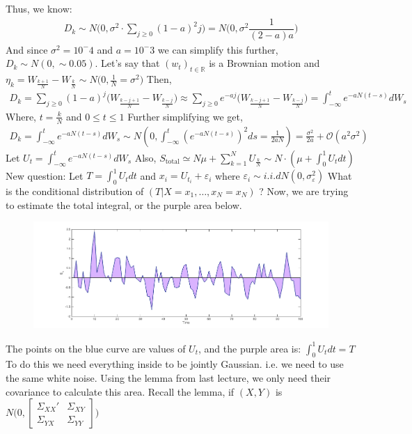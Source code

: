 \documentclass[../../../Master/AppliedStochastics.tex]{subfiles}
\begin{document}
Thus, we know: 
$$\begin{aligned}
	D_{k}\sim N\bigg(0, \sigma^2 \cdot \sum_{j\geq0}(1-a)^2j\bigg) = N\bigg(0, \sigma^2 \dfrac{1}{(2-a)a}\bigg)
\end{aligned}$$
And since $\sigma^2 = 10^-4$ and $a=10^-3$ we can simplify this further, $D_{k} \sim N(0, \sim0.05)$. 
Let's say that $(w_{t})_{t\in\mathbb{R}}$ is a Brownian motion 
and $\eta_{k}= W_\frac{{k+1}}{N} - W_\frac{{k}}{N} \sim N\big(0, \frac{1}{N}=\sigma^2\big)$
Then, 
$$\begin{aligned}
	D_{k}= \sum_{j\geq0} (1-a)^j \Big(W_\frac{{k-j+1}}{N} - W_\frac{{k-j}}{N} \Big) \approx \sum_{j\geq0} e^{-aj} \Big(W_\frac{{k-j+1}}{N} - W_\frac{{k-j}}{N} \Big) = \int_{-\infty}^{t} e^{-aN(t-s)}dW_{s}
\end{aligned}$$
Where, $t=\frac{k}{N}$ and $0\leq t \leq 1$ 
Further simplifying we get, 
$$\begin{aligned}
D_{k}= \int_{-\infty}^{t} e^{-aN(t-s)}dW_{s} \sim N(0, \int_{-\infty}^{t}(e^{-aN(t-s)})^2 ds = \frac{1}{2aN}) = \frac{\sigma^2}{2a} + \mathcal{O}(a^2\sigma^2)
\end{aligned}$$
Let $U_{t} = \int_{-\infty}^{t} e^{-aN(t-s)} dW_{s}$ 
Also, $S_{\mathrm{total}}\simeq N\mu + \sum_{k=1}^{N} U_{\frac{k}{N}} \sim N\cdot(\mu + \int_{0}^{1}U_{t}dt)$
New question: Let $T=\int_{0}^{1} U_{t}dt$ 
and $x_{i} = U_{t_{i}} + \varepsilon_{i}$ where $\varepsilon_{i}\sim i.i.d N(0,\sigma_{\varepsilon}^2)$ 
What is the conditional distribution of $(T\vert X=x_{1},\dotso, x_{N}=x_{N})$ ? 
Now, we are trying to estimate the total integral, or the purple area below. 
\begin{figure}[H]
	\centering
	\includegraphics[width=0.7\linewidth]{area2}
	\caption*{}
	\label{fig:area2}
\end{figure}
The points on the blue curve are values of $U_{t}$, 
and the purple area is: $\int_{0}^{1} U_{t}dt = T$ 
To do this we need everything inside to be jointly Gaussian. 
i.e. we need to use the same white noise. 
Using the lemma from last lecture, 
we only need their covariance to calculate this area.
Recall the lemma,
if $(X,Y)$ is $N\Bigg(0, \begin{bmatrix} \Sigma_{XX}' & \Sigma_{XY} \\ \Sigma_{YX} & \Sigma_{YY}\end{bmatrix}\Bigg)$
\end{document}
